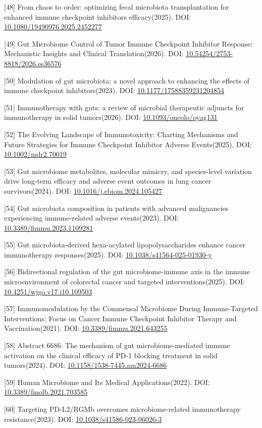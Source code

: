 {[}48{]} From chaos to order: optimizing fecal microbiota transplantation for enhanced immune checkpoint inhibitors efficacy(2025). DOI: \url{10.1080/19490976.2025.2452277}

{[}49{]} Gut Microbiome Control of Tumor Immune Checkpoint Inhibitor Response: Mechanistic Insights and Clinical Translation(2026). DOI: \url{10.54254/2753-8818/2026.es36576}

{[}50{]} Modulation of gut microbiota: a novel approach to enhancing the effects of immune checkpoint inhibitors(2023). DOI: \url{10.1177/17588359231204854}

{[}51{]} Immunotherapy with guts: a review of microbial therapeutic adjuncts for immunotherapy in solid tumors(2026). DOI: \url{10.1093/oncolo/oyag131}

{[}52{]} The Evolving Landscape of Immunotoxicity: Charting Mechanisms and Future Strategies for Immune Checkpoint Inhibitor Adverse Events(2025). DOI: \url{10.1002/mdr2.70019}

{[}53{]} Gut microbiome metabolites, molecular mimicry, and species-level variation drive long-term efficacy and adverse event outcomes in lung cancer survivors(2024). DOI: \url{10.1016/j.ebiom.2024.105427}

{[}54{]} Gut microbiota composition in patients with advanced malignancies experiencing immune-related adverse events(2023). DOI: \url{10.3389/fimmu.2023.1109281}

{[}55{]} Gut microbiota-derived hexa-acylated lipopolysaccharides enhance cancer immunotherapy responses(2025). DOI: \url{10.1038/s41564-025-01930-y}

{[}56{]} Bidirectional regulation of the gut microbiome-immune axis in the immune microenvironment of colorectal cancer and targeted interventions(2025). DOI: \url{10.4251/wjgo.v17.i10.109503}

{[}57{]} Immunomodulation by the Commensal Microbiome During Immune-Targeted Interventions: Focus on Cancer Immune Checkpoint Inhibitor Therapy and Vaccination(2021). DOI: \url{10.3389/fimmu.2021.643255}

{[}58{]} Abstract 6686: The mechanism of gut microbiome-mediated immune activation on the clinical efficacy of PD-1 blocking treatment in solid tumors(2024). DOI: \url{10.1158/1538-7445.am2024-6686}

{[}59{]} Human Microbiome and Its Medical Applications(2022). DOI: \url{10.3389/fmolb.2021.703585}

{[}60{]} Targeting PD-L2/RGMb overcomes microbiome-related immunotherapy resistance(2023). DOI: \url{10.1038/s41586-023-06026-3}

